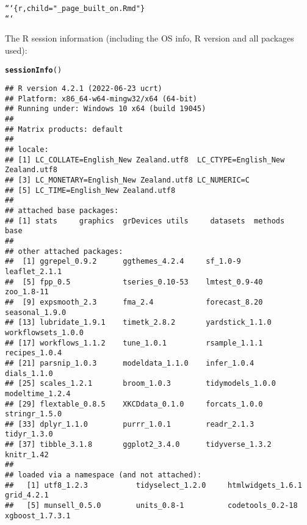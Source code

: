 \documentclass{article}\usepackage[]{graphicx}\usepackage[]{xcolor}
\makeatletter
\newcommand{\hlstr}[1]{\textcolor[rgb]{0.192,0.494,0.8}{#1}}%
\newcommand{\hlstd}[1]{\textcolor[rgb]{0.345,0.345,0.345}{#1}}%
\newcommand{\hlkwd}[1]{\textcolor[rgb]{0.737,0.353,0.396}{\textbf{#1}}}%
\newenvironment{kframe}{%
 \def\at@end@of@kframe{}%
 \ifinner\ifhmode%
  \def\at@end@of@kframe{\end{minipage}}%
  \begin{minipage}{\columnwidth}%
 \fi\fi%
 \def\FrameCommand##1{\hskip\@totalleftmargin \hskip-\fboxsep
 \colorbox{shadecolor}{##1}\hskip-\fboxsep
     \hskip-\linewidth \hskip-\@totalleftmargin \hskip\columnwidth}%
 \MakeFramed {\advance\hsize-\width
   \@totalleftmargin\z@ \linewidth\hsize
   \@setminipage}}%
 {\par\unskip\endMakeFramed%
 \at@end@of@kframe}
\newenvironment{knitrout}{}{} %
\makeatother
\begin{document}
\begin{knitrout}
\begin{kframe}
\begin{alltt}
```\{r, child=\hlstr{"_page_built_on.Rmd"}\}
```
\end{alltt}


{\ttfamily\noindent\bfseries{}}\end{kframe}
\end{knitrout}

The R session information (including the OS info, R version and all
packages used):

\begin{knitrout}
\color{fgcolor}\begin{kframe}
\begin{alltt}
\hlkwd{sessionInfo}\hlstd{()}
\end{alltt}
\begin{verbatim}
## R version 4.2.1 (2022-06-23 ucrt)
## Platform: x86_64-w64-mingw32/x64 (64-bit)
## Running under: Windows 10 x64 (build 19045)
## 
## Matrix products: default
## 
## locale:
## [1] LC_COLLATE=English_New Zealand.utf8  LC_CTYPE=English_New Zealand.utf8   
## [3] LC_MONETARY=English_New Zealand.utf8 LC_NUMERIC=C                        
## [5] LC_TIME=English_New Zealand.utf8    
## 
## attached base packages:
## [1] stats     graphics  grDevices utils     datasets  methods   base     
## 
## other attached packages:
##  [1] ggrepel_0.9.2      ggthemes_4.2.4     sf_1.0-9           leaflet_2.1.1     
##  [5] fpp_0.5            tseries_0.10-53    lmtest_0.9-40      zoo_1.8-11        
##  [9] expsmooth_2.3      fma_2.4            forecast_8.20      seasonal_1.9.0    
## [13] lubridate_1.9.1    timetk_2.8.2       yardstick_1.1.0    workflowsets_1.0.0
## [17] workflows_1.1.2    tune_1.0.1         rsample_1.1.1      recipes_1.0.4     
## [21] parsnip_1.0.3      modeldata_1.1.0    infer_1.0.4        dials_1.1.0       
## [25] scales_1.2.1       broom_1.0.3        tidymodels_1.0.0   modeltime_1.2.4   
## [29] flextable_0.8.5    XKCDdata_0.1.0     forcats_1.0.0      stringr_1.5.0     
## [33] dplyr_1.1.0        purrr_1.0.1        readr_2.1.3        tidyr_1.3.0       
## [37] tibble_3.1.8       ggplot2_3.4.0      tidyverse_1.3.2    knitr_1.42        
## 
## loaded via a namespace (and not attached):
##   [1] utf8_1.2.3           tidyselect_1.2.0     htmlwidgets_1.6.1    grid_4.2.1          
##   [5] munsell_0.5.0        units_0.8-1          codetools_0.2-18     xgboost_1.7.3.1     

\end{verbatim}
\end{kframe}
\end{knitrout}
\end{document}
